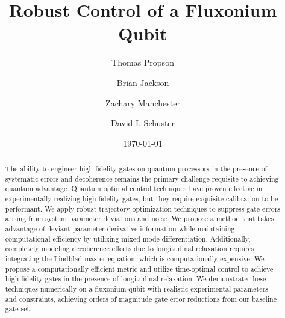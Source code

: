 \title{Robust Control of a Fluxonium Qubit}

\author{Thomas Propson}
\author{Brian Jackson}
\author{Zachary Manchester}
\author{David I. Schuster}

\date{\today}

\begin{abstract}
  The ability to engineer high-fidelity gates on quantum processors in the presence of
  systematic errors and decoherence remains the primary challenge requisite to achieving quantum advantage.
  Quantum optimal control techniques have proven effective in experimentally
  realizing high-fidelity gates, but they require exquisite calibration to be performant.
  We apply robust trajectory optimization techniques to suppress gate errors arising from system
  parameter deviations and noise.
  We propose a method that takes advantage of deviant parameter derivative information while maintaining
  computational efficiency by utilizing mixed-mode differentiation.
  Additionally, completely modeling decoherence effects due to longitudinal relaxation requires
  integrating the Lindblad master equation, which is computationally expensive.
  We propose a computationally efficient metric
  and utilize time-optimal control to achieve high fidelity gates in the presence of longitudinal relaxation.
  We demonstrate these techniques numerically on a fluxonium qubit with realistic
  experimental parameters and constraints,
  achieving orders of magnitude gate error reductions from our baseline gate set.
\end{abstract}
